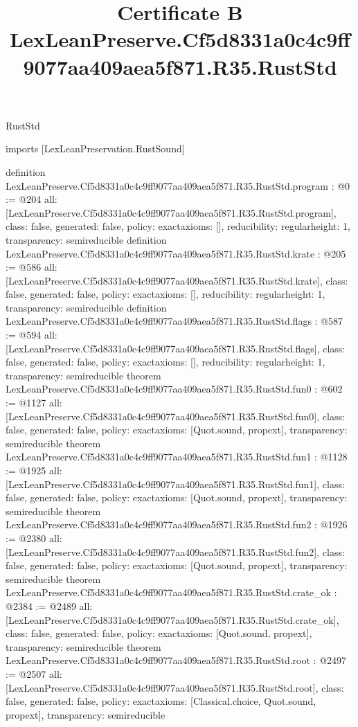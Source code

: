 \begin{lexlean}{RustStd}
\title{Certificate B LexLeanPreserve.Cf5d8331a0c4c9ff9077aa409aea5f871.R35.RustStd}
\begin{coremodule}
imports [LexLeanPreservation.RustSound]

definition LexLeanPreserve.Cf5d8331a0c4c9ff9077aa409aea5f871.R35.RustStd.program : @0 := @204 {
  all: [LexLeanPreserve.Cf5d8331a0c4c9ff9077aa409aea5f871.R35.RustStd.program],
  class: false,
  generated: false,
  policy: exact{axioms: []},
  reducibility: regular{height: 1},
  transparency: semireducible
}
definition LexLeanPreserve.Cf5d8331a0c4c9ff9077aa409aea5f871.R35.RustStd.krate : @205 := @586 {
  all: [LexLeanPreserve.Cf5d8331a0c4c9ff9077aa409aea5f871.R35.RustStd.krate],
  class: false,
  generated: false,
  policy: exact{axioms: []},
  reducibility: regular{height: 1},
  transparency: semireducible
}
definition LexLeanPreserve.Cf5d8331a0c4c9ff9077aa409aea5f871.R35.RustStd.flags : @587 := @594 {
  all: [LexLeanPreserve.Cf5d8331a0c4c9ff9077aa409aea5f871.R35.RustStd.flags],
  class: false,
  generated: false,
  policy: exact{axioms: []},
  reducibility: regular{height: 1},
  transparency: semireducible
}
theorem LexLeanPreserve.Cf5d8331a0c4c9ff9077aa409aea5f871.R35.RustStd.fun0 : @602 := @1127 {
  all: [LexLeanPreserve.Cf5d8331a0c4c9ff9077aa409aea5f871.R35.RustStd.fun0],
  class: false,
  generated: false,
  policy: exact{axioms: [Quot.sound, propext]},
  transparency: semireducible
}
theorem LexLeanPreserve.Cf5d8331a0c4c9ff9077aa409aea5f871.R35.RustStd.fun1 : @1128 := @1925 {
  all: [LexLeanPreserve.Cf5d8331a0c4c9ff9077aa409aea5f871.R35.RustStd.fun1],
  class: false,
  generated: false,
  policy: exact{axioms: [Quot.sound, propext]},
  transparency: semireducible
}
theorem LexLeanPreserve.Cf5d8331a0c4c9ff9077aa409aea5f871.R35.RustStd.fun2 : @1926 := @2380 {
  all: [LexLeanPreserve.Cf5d8331a0c4c9ff9077aa409aea5f871.R35.RustStd.fun2],
  class: false,
  generated: false,
  policy: exact{axioms: [Quot.sound, propext]},
  transparency: semireducible
}
theorem LexLeanPreserve.Cf5d8331a0c4c9ff9077aa409aea5f871.R35.RustStd.crate_ok : @2384 := @2489 {
  all: [LexLeanPreserve.Cf5d8331a0c4c9ff9077aa409aea5f871.R35.RustStd.crate_ok],
  class: false,
  generated: false,
  policy: exact{axioms: [Quot.sound, propext]},
  transparency: semireducible
}
theorem LexLeanPreserve.Cf5d8331a0c4c9ff9077aa409aea5f871.R35.RustStd.root : @2497 := @2507 {
  all: [LexLeanPreserve.Cf5d8331a0c4c9ff9077aa409aea5f871.R35.RustStd.root],
  class: false,
  generated: false,
  policy: exact{axioms: [Classical.choice, Quot.sound, propext]},
  transparency: semireducible
}


\end{coremodule}
\end{lexlean}
